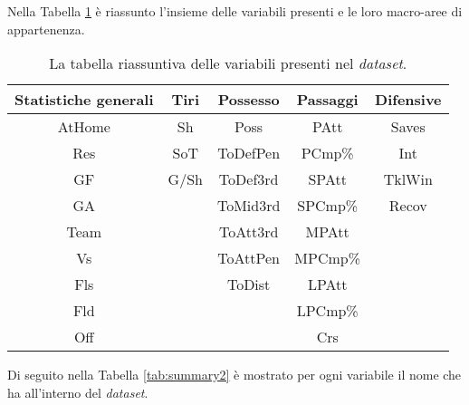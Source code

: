Nella Tabella \ref{tab:summary} è riassunto l'insieme delle variabili presenti e le loro macro-aree di appartenenza.\\
\begin{table}[!htb]%
	
	\renewcommand{\arraystretch}{1.7}
	\centering
	\begin{tabular}{c c c c c}
		\hline	
		\rowcolor{SchoolColor2}
		\textbf{Statistiche generali} & \textbf{Tiri} & \textbf{Possesso} & \textbf{Passaggi} & \textbf{Difensive} \\	
		\hline			
		AtHome & Sh & Poss & PAtt & Saves\\
		Res & SoT & ToDefPen & PCmp\% & Int\\
		GF & G/Sh & ToDef3rd & SPAtt & TklWin\\
		GA &  & ToMid3rd & SPCmp\% & Recov\\
		Team &  & ToAtt3rd & MPAtt&\\
		Vs &  & ToAttPen & MPCmp\% &\\
		Fls &  & ToDist & LPAtt &\\
		Fld &  &  & LPCmp\% &\\
		Off &  &  & Crs \\
		\hline
		
		
	\end{tabular} \hbox{}
	
	\caption{La tabella riassuntiva delle variabili presenti nel \emph{dataset}.} \label{tab:summary}
\end{table}

Di seguito nella Tabella \ref{tab:summary2} è mostrato per ogni variabile il nome che ha all'interno del \emph{dataset}.


